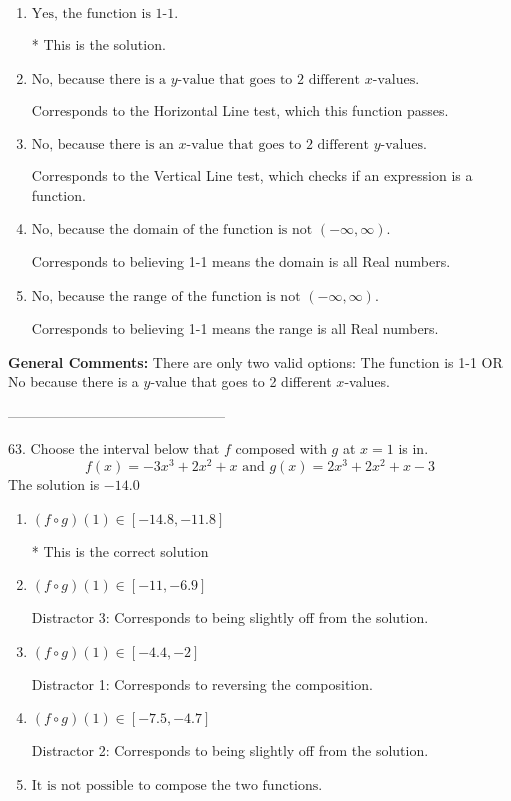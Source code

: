 \documentclass{extbook}[14pt]
\begin{document}
\begin{enumerate}[label=\Alph*.] 
\item $ \text{Yes, the function is 1-1.} $ 

 * This is the solution. 
\item $ \text{No, because there is a $y$-value that goes to 2 different $x$-values.} $ 

 Corresponds to the Horizontal Line test, which this function passes. 
\item $ \text{No, because there is an $x$-value that goes to 2 different $y$-values.} $ 

 Corresponds to the Vertical Line test, which checks if an expression is a function. 
\item $ \text{No, because the domain of the function is not $(-\infty, \infty)$.} $ 

 Corresponds to believing 1-1 means the domain is all Real numbers. 
\item $ \text{No, because the range of the function is not $(-\infty, \infty)$.} $ 

 Corresponds to believing 1-1 means the range is all Real numbers. 
\end{enumerate} 
 
\textbf{General Comments:} There are only two valid options: The function is 1-1 OR No because there is a $y$-value that goes to 2 different $x$-values.

-----------------------------------------------

63. Choose the interval below that $f$ composed with $g$ at $x=1$ is in.
\[ f(x) = -3x^{3} +2 x^{2} +x \text{ and } g(x) = 2x^{3} +2 x^{2} +x -3 \] 
The solution is $ -14.0 $ 

\begin{enumerate}[label=\Alph*.] 
\item $ (f \circ g)(1) \in [-14.8, -11.8] $ 

 * This is the correct solution 
\item $ (f \circ g)(1) \in [-11, -6.9] $ 

  Distractor 3: Corresponds to being slightly off from the solution. 
\item $ (f \circ g)(1) \in [-4.4, -2] $ 

  Distractor 1: Corresponds to reversing the composition. 
\item $ (f \circ g)(1) \in [-7.5, -4.7] $ 

  Distractor 2: Corresponds to being slightly off from the solution. 
\item $ \text{It is not possible to compose the two functions.} $ 

  
\end{enumerate} 
 
\end{document}
